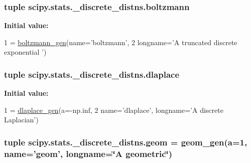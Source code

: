 \subsubsection[{boltzmann}]{\setlength{\rightskip}{0pt plus 5cm}tuple scipy.\+stats.\+\_\+discrete\+\_\+distns.\+boltzmann}\label{namespacescipy_1_1stats_1_1__discrete__distns_ad85ac97a7d5fd92f96c97845f8cd3edf}
{\bfseries Initial value\+:}
\begin{DoxyCode}
1 = \hyperlink{classscipy_1_1stats_1_1__discrete__distns_1_1boltzmann__gen}{boltzmann\_gen}(name=\textcolor{stringliteral}{'boltzmann'},
2         longname=\textcolor{stringliteral}{'A truncated discrete exponential '})
\end{DoxyCode}
\hypertarget{namespacescipy_1_1stats_1_1__discrete__distns_a6f4af8fed44c05cf29c3871a777adcbe}{}
\subsubsection[{dlaplace}]{\setlength{\rightskip}{0pt plus 5cm}tuple scipy.\+stats.\+\_\+discrete\+\_\+distns.\+dlaplace}\label{namespacescipy_1_1stats_1_1__discrete__distns_a6f4af8fed44c05cf29c3871a777adcbe}
{\bfseries Initial value\+:}
\begin{DoxyCode}
1 = \hyperlink{classscipy_1_1stats_1_1__discrete__distns_1_1dlaplace__gen}{dlaplace\_gen}(a=-np.inf,
2                         name=\textcolor{stringliteral}{'dlaplace'}, longname=\textcolor{stringliteral}{'A discrete Laplacian'})
\end{DoxyCode}
\hypertarget{namespacescipy_1_1stats_1_1__discrete__distns_afd301673281c3e3e67f0b707a2d36ce4}{}
\subsubsection[{geom}]{\setlength{\rightskip}{0pt plus 5cm}tuple scipy.\+stats.\+\_\+discrete\+\_\+distns.\+geom = {\bf geom\+\_\+gen}({\bf a}=1, name='geom', longname=\char`\"{}A geometric\char`\"{})}\label{namespacescipy_1_1stats_1_1__discrete__distns_afd301673281c3e3e67f0b707a2d36ce4}
\hypertarget{namespacescipy_1_1stats_1_1__discrete__distns_a384e86a8b065ea9cc1322478d4a068a0}{}
